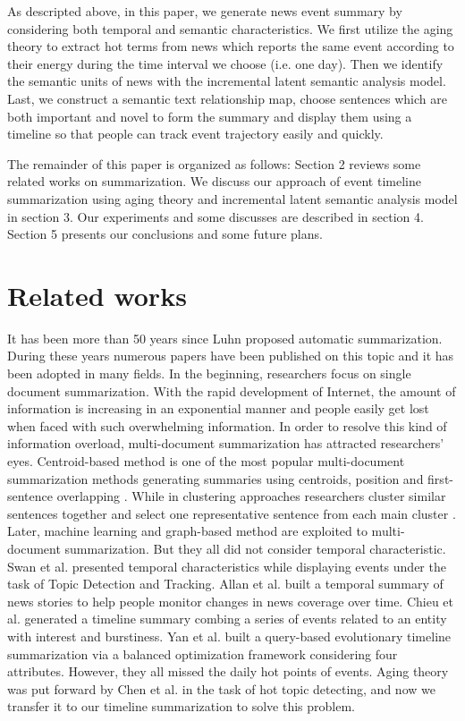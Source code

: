 \documentclass[runningheads,a4paper]{llncs}
\begin{document}
As descripted above, in this paper, we generate news event summary by considering both temporal and semantic characteristics. We first utilize the aging theory \cite{2003-Chen-p47-59} to extract hot terms from news which reports the same event according to their energy during the time interval we choose (i.e. one day). Then we identify the semantic units of news with the incremental latent semantic analysis model. Last, we construct a semantic text relationship map, choose sentences which are both important and novel to form the summary and display them using a timeline so that people can track event trajectory easily and quickly.

The remainder of this paper is organized as follows: Section 2 reviews some related works on summarization. We discuss our approach of event timeline summarization using aging theory and incremental latent semantic analysis model in section 3. Our experiments and some discusses are described in section 4. Section 5 presents our conclusions and some future plans.

\section{Related works}

It has been more than 50 years since Luhn \cite{1958-Luhn-p159-165} proposed automatic summarization. During these years numerous papers have been published on this topic and it has been adopted in many fields. In the beginning, researchers focus on single document summarization. With the rapid development of Internet, the amount of information is increasing in an exponential manner and people easily get lost when faced with such overwhelming information. In order to resolve this kind of information overload, multi-document summarization has attracted researchers' eyes. Centroid-based method is one of the most popular multi-document summarization methods generating summaries using centroids, position and first-sentence overlapping \cite{2004-Radev-p919-938}. While in clustering approaches researchers cluster similar sentences together and select one representative sentence from each main cluster \cite{1997-Salton-p193-207,2005-Harabagiu-p202-209}. Later, machine learning \cite{2008-Wong-p985-992} and graph-based method \cite{2004-Erkan-p365-371,2005-Mihalcea-p-} are exploited to multi-document summarization. But they all did not consider temporal characteristic.
Swan et al. \cite{2000-Swan-p49-56} presented temporal characteristics while displaying events under the task of Topic Detection and Tracking. Allan et al. \cite{2001-Allan-p10-18} built a temporal summary of news stories to help people monitor changes in news coverage over time. Chieu et al. \cite{2004-Chieu-p425-432} generated a timeline summary combing a series of events related to an entity with interest and burstiness. Yan et al.\cite{2011-Yan-p745-754} built a query-based evolutionary timeline summarization via a balanced optimization framework considering four attributes. However, they all missed the daily hot points of events. Aging theory was put forward by Chen et al. \cite{1990-Deerwester-p391-407} in the task of hot topic detecting, and now we transfer it to our timeline summarization to solve this problem.
\end{document}
